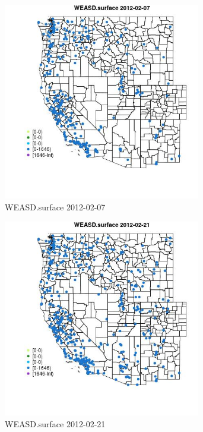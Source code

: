 \begin{figure} 
\centering  
\includegraphics[width=0.77\textwidth]{Code_Outputs/Report_ML_input_PM25_Step4_part_f_de_duplicated_aves_prioritize_24hr_obswNAs_MapObsWEASDsurface2012-02-07.jpg} 
\caption{\label{fig:Report_ML_input_PM25_Step4_part_f_de_duplicated_aves_prioritize_24hr_obswNAsMapObsWEASDsurface2012-02-07}WEASD.surface 2012-02-07} 
\end{figure} 
 

\begin{figure} 
\centering  
\includegraphics[width=0.77\textwidth]{Code_Outputs/Report_ML_input_PM25_Step4_part_f_de_duplicated_aves_prioritize_24hr_obswNAs_MapObsWEASDsurface2012-02-21.jpg} 
\caption{\label{fig:Report_ML_input_PM25_Step4_part_f_de_duplicated_aves_prioritize_24hr_obswNAsMapObsWEASDsurface2012-02-21}WEASD.surface 2012-02-21} 
\end{figure} 
 

